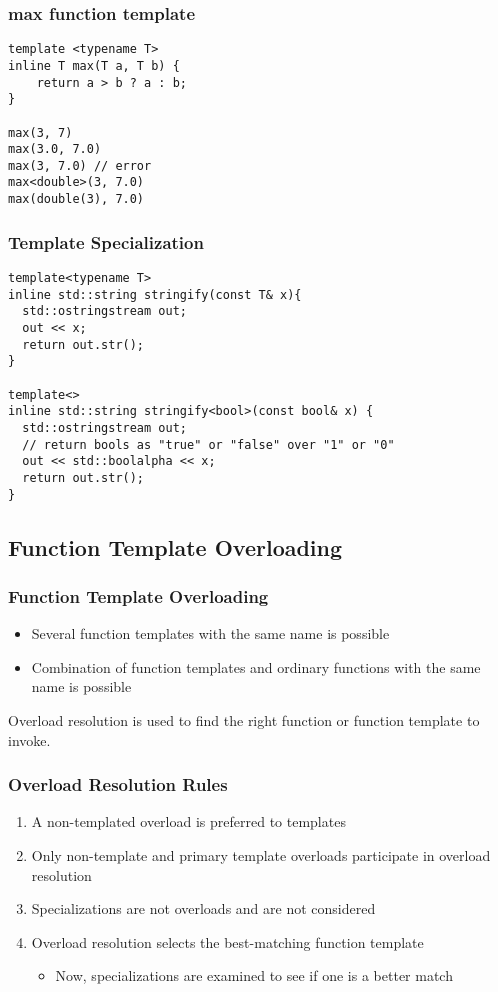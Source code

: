 \documentclass{beamer}
\begin{document}
\begin{frame}[fragile]
\frametitle{max function template}

\begin{lstlisting}
template <typename T>
inline T max(T a, T b) {
    return a > b ? a : b;
}

max(3, 7)
max(3.0, 7.0)
max(3, 7.0) // error
max<double>(3, 7.0)
max(double(3), 7.0)
\end{lstlisting}

\end{frame}

\begin{frame}[fragile]
\frametitle{Template Specialization}
\begin{lstlisting}
template<typename T> 
inline std::string stringify(const T& x){
  std::ostringstream out;
  out << x;
  return out.str();
}

template<> 
inline std::string stringify<bool>(const bool& x) {
  std::ostringstream out;
  // return bools as "true" or "false" over "1" or "0" 
  out << std::boolalpha << x; 
  return out.str();
}

\end{lstlisting}

\end{frame}

\subsection{Function Template Overloading}
\begin{frame}
\frametitle{Function Template Overloading}

\begin{itemize}
\item Several function templates with the same name is possible
\item Combination of function templates and ordinary functions with the same name is possible
\end{itemize}

Overload resolution is used to find the right function or function template to invoke.

\end{frame}

\begin{frame}[fragile]
\frametitle{Overload Resolution Rules}

\begin{enumerate}
\item A non-templated overload is preferred to templates
\item Only non-template and primary template overloads participate in overload resolution
\item Specializations are not overloads and are not considered
\item Overload resolution selects the best-matching function template
    \begin{itemize}
        \item Now, specializations are examined to see if one is a better match
    \end{itemize}
\end{enumerate}
\end{frame}
\end{document}
